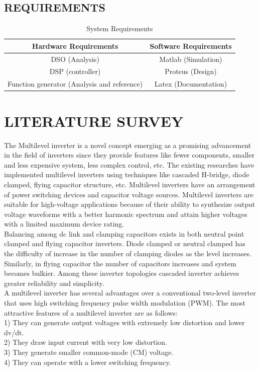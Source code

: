 \documentclass[12pt,a4paper]{report}
\begin{document}
\section{REQUIREMENTS}

\begin{table}[h!]
	\centering
	\begin{tabular}{|c|c|} 
		\hline
		{\bf Hardware Requirements} & {\bf Software Requirements} \\  
		\hline
		DSO (Analysis) & Matlab (Simulation) \\ 
		\hline
		DSP (controller) & Proteus (Design) \\
		\hline
		Function generator (Analysis and reference) & Latex (Documentation) \\
		\hline
		
		
	\end{tabular}
	\caption{System Requirements}
	

\end{table}

\chapter{LITERATURE SURVEY}

 
The Multilevel inverter is a novel concept emerging as a promising advancement in the field of inverters since they provide features like fewer components, smaller and less expensive system, less complex control, etc. 
The existing researches have implemented multilevel inverters using techniques like cascaded H-bridge, diode clamped, flying capacitor structure, etc. Multilevel inverters have an arrangement of power switching
devices and capacitor voltage sources. Multilevel inverters are suitable for
high-voltage applications because of their ability to synthesize output voltage
waveforms with a better harmonic spectrum and attain higher voltages with a
limited maximum device rating.\\

 
Balancing among dc link and clamping capacitors exists in
both neutral point clamped and flying capacitor inverters.
Diode clamped or neutral clamped has the difficulty of increase
in the number of clamping diodes as the level increases.
Similarly, in flying capacitor the number of capacitors
increases and system becomes bulkier. Among these inverter
topologies cascaded inverter achieves greater reliability and
simplicity.\\


A multilevel inverter has several advantages over a conventional
two-level inverter that uses high switching frequency pulse width modulation
(PWM). The most attractive features of a multilevel inverter are as follows:\\
1) They can generate output voltages with extremely low
distortion and lower dv/dt.\\
2) They draw input current with very low distortion.\\
3) They generate smaller common-mode (CM) voltage.\\
4) They can operate with a lower switching frequency.\\
\end{document}
